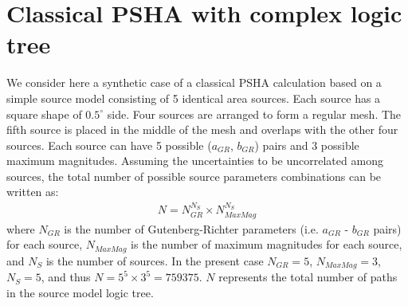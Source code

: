 \section{Classical PSHA with complex logic tree}
We consider here a synthetic case of a classical PSHA calculation based on a simple source model consisting of 5 identical area sources. Each source has a square shape of $0.5^{\circ}$ side. Four sources are arranged to form a regular mesh. The fifth source is placed in the middle of the mesh and overlaps with the other
four sources. Each source can have 5 possible ($a_{GR}$, $b_{GR}$) pairs and 3 possible
maximum magnitudes. Assuming the uncertainties to be uncorrelated among sources, the total number of
possible source parameters combinations can be written as:
\begin{align}
N = N_{GR}^{N_{S}} \times N_{MaxMag}^{N_{S}}
\end{align}
where $N_{GR}$ is the number of Gutenberg-Richter parameters (i.e. $a_{GR}$ - $b_{GR}$ pairs) for each
source, $N_{MaxMag}$ is the number of maximum magnitudes for each source, and $N_{S}$ is the number
of sources. In the present case $N_{GR}=5$, $N_{MaxMag}=3$, $N_{S}=5$, and thus $N=5^{5} \times 3^{5}=759375$. $N$ represents the total number of paths in the source model logic tree.

